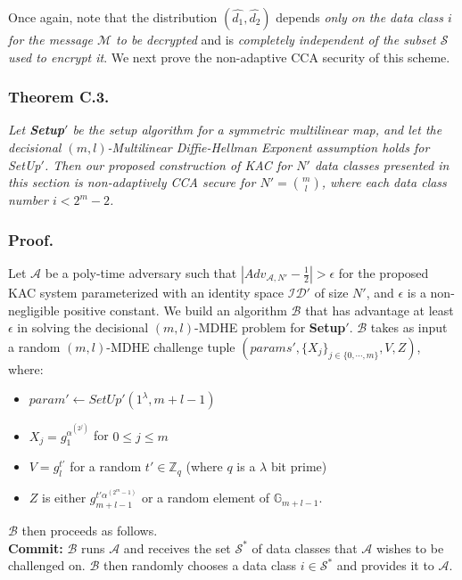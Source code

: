 Once again, note that the distribution $(\hat{d_1},\hat{d_2})$ depends \emph{only on the data class $i$ for the message $\mathcal{M}$ to be decrypted} and is \emph{completely independent of the subset $\mathcal{S}$ used to encrypt it}. We next prove the non-adaptive CCA security of this scheme. 

\subsubsection{Theorem C.3.} \textit{Let \textbf{Setup}$'$ be the setup algorithm for a symmetric multilinear map, and let the decisional $(m,l)$-Multilinear Diffie-Hellman Exponent assumption holds for {SetUp}$'$. Then our proposed construction of KAC for $N'$ data classes presented in this section is non-adaptively CCA secure for $N'=\binom{m}{l}$, where each data class number $i<2^m-2$.}

\subsubsection{Proof.} Let $\mathcal{A}$ be a poly-time adversary such that $|Adv_{\mathcal{A},N'}-\frac{1}{2}| > \epsilon$ for the proposed KAC system parameterized with an identity space $\mathcal{ID}'$ of size $N'$, and $\epsilon$ is a non-negligible positive constant. We build an algorithm $\mathcal{B}$ that has advantage at least $\epsilon$ in solving the decisional $(m,l)$-MDHE problem for \textbf{Setup}$'$. $\mathcal{B}$ takes as input a random $(m,l)$-MDHE challenge tuple $(params',\{X_j\}_{j\in\{0,\cdots,m\}},V,Z)$, where:
\begin{itemize}
 \item $param'\leftarrow SetUp'(1^{\lambda},m+l-1)$
 \item $X_j=g^{\alpha^{(2^j)}}_{1}$ for $0\leq j \leq m$
 \item $V=g^{t'}_{l}$ for a random $t'\in\mathbb{Z}_q$ (where $q$ is a $\lambda$ bit prime)
 \item $Z$ is either $g^{t'\alpha^{(2^m-1)}}_{m+l-1}$ or a random element of $\mathbb{G}_{m+l-1}$.
\end{itemize}
\noindent $\mathcal{B}$ then proceeds as follows.\\

\noindent \textbf{Commit:} $\mathcal{B}$ runs $\mathcal{A}$ and receives the set ${\mathcal{S}}^{*}$ of data classes that $\mathcal{A}$ wishes to be challenged on. $\mathcal{B}$ then randomly chooses a data class $i\in{\mathcal{S}}^{*}$ and provides it to $\mathcal{A}$.\\
 
